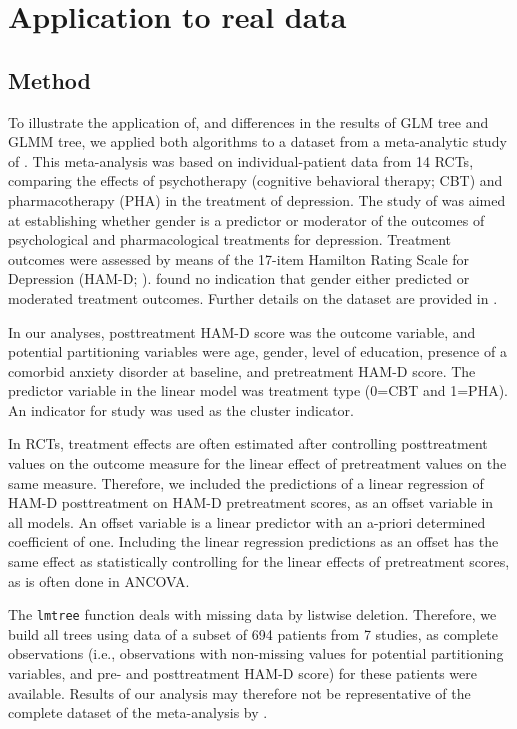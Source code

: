 \documentclass[nobf,doc]{apa}
\begin{document}
\section{Application to real data}

\subsection{Method}
To illustrate the application of, and differences in the results of GLM tree and GLMM tree, we applied both algorithms to a dataset from a meta-analytic study of . This meta-analysis was based on individual-patient data from 14 RCTs, comparing the effects of psychotherapy (cognitive behavioral therapy; CBT) and pharmacotherapy (PHA) in the treatment of depression. The study of  was aimed at establishing whether gender is a predictor or moderator of the outcomes of psychological and pharmacological treatments for depression. Treatment outcomes were assessed by means of the 17-item Hamilton Rating Scale for Depression (HAM-D; ).  found no indication that gender either predicted or moderated treatment outcomes. Further details on the dataset are provided in .

In our analyses, posttreatment HAM-D score was the outcome variable, and potential partitioning variables were age, gender, level of education, presence of a comorbid anxiety disorder at baseline, and pretreatment HAM-D score. The predictor variable in the linear model was treatment type (0=CBT and 1=PHA). An indicator for study was used as the cluster indicator. 

In RCTs, treatment effects are often estimated after controlling posttreatment values on the outcome measure for the linear effect of pretreatment values on the same measure. Therefore, we included the predictions of a linear regression of HAM-D posttreatment on HAM-D pretreatment scores, as an offset variable in all models. An offset variable is a linear predictor with an a-priori determined coefficient of one. Including the linear regression predictions as an offset has the same effect as statistically controlling for the linear effects of pretreatment scores, as is often done in ANCOVA. 

The \verb|lmtree| function deals with missing data by listwise deletion. Therefore, we build all trees using data of a subset of 694 patients from 7 studies, as complete observations (i.e., observations with non-missing values for potential partitioning variables, and pre- and posttreatment HAM-D score) for these patients were available. Results of our analysis may therefore not be representative of the complete dataset of the meta-analysis by \cite{CuijyWeit14}. 
\end{document}

